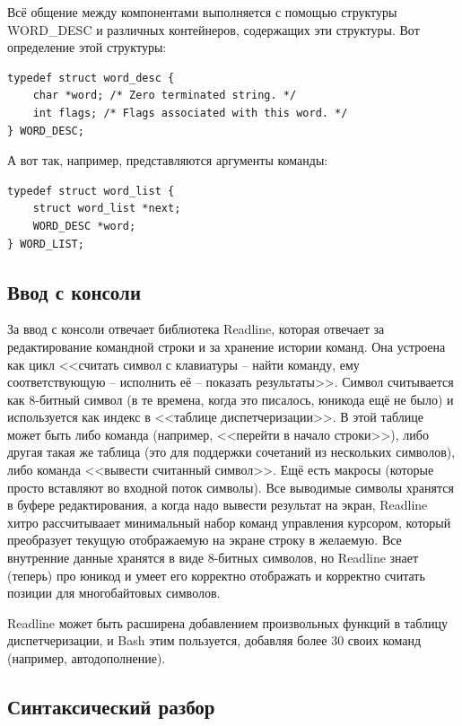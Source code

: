 \documentclass[a5paper]{article}
\begin{document}
Всё общение между компонентами выполняется с помощью структуры WORD\_DESC и различных контейнеров, содержащих эти структуры. Вот определение этой структуры:

\begin{verbatim}
typedef struct word_desc {
    char *word; /* Zero terminated string. */
    int flags; /* Flags associated with this word. */
} WORD_DESC;
\end{verbatim}

А вот так, например, представляются аргументы команды:

\begin{verbatim}
typedef struct word_list {
    struct word_list *next;
    WORD_DESC *word;
} WORD_LIST;
\end{verbatim}

\subsection{Ввод с консоли}

За ввод с консоли отвечает библиотека Readline, которая отвечает за редактирование командной строки и за хранение истории команд. Она устроена как цикл <<считать символ с клавиатуры -- найти команду, ему соответствующую -- исполнить её -- показать результаты>>. Символ считывается как 8-битный символ (в те времена, когда это писалось, юникода ещё не было) и используется как индекс в <<таблице диспетчеризации>>. В этой таблице может быть либо команда (например, <<перейти в начало строки>>), либо другая такая же таблица (это для поддержки сочетаний из нескольких символов), либо команда <<вывести считанный символ>>. Ещё есть макросы (которые просто вставляют во входной поток символы). Все выводимые символы хранятся в буфере редактирования, а когда надо вывести результат на экран, Readline хитро рассчитываает минимальный набор команд управления курсором, который преобразует текущую отображаемую на экране строку в желаемую. Все внутренние данные хранятся в виде 8-битных символов, но Readline знает (теперь) про юникод и умеет его корректно отображать и корректно считать позиции для многобайтовых символов.

Readline может быть расширена добавлением произвольных функций в таблицу диспетчеризации, и Bash этим пользуется, добавляя более 30 своих команд (например, автодополнение).

\subsection{Синтаксический разбор}
\end{document}
